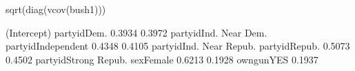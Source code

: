 \begin{Schunk}
\begin{Sinput}
   sqrt(diag(vcov(bush1)))
\end{Sinput}
\begin{Soutput}
            (Intercept)             partyidDem. 
                 0.3934                  0.3972 
  partyidInd. Near Dem.      partyidIndependent 
                 0.4348                  0.4105 
partyidInd. Near Repub.           partyidRepub. 
                 0.5073                  0.4502 
   partyidStrong Repub.               sexFemale 
                 0.6213                  0.1928 
              owngunYES 
                 0.1937 
\end{Soutput}
\end{Schunk}
